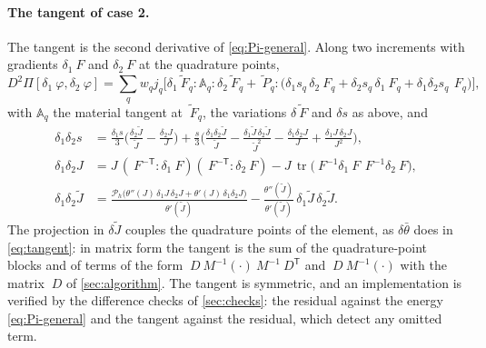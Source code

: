 \documentclass{article}
\newcommand{\F}{~F}
\renewcommand{\P}{~P}
\newcommand{\disp}{~\varphi}
\newcommand{\trace}{\operatorname{tr}}
\newcommand{\transpose}[1]{#1^{\mathsf{T}}}
\theoremstyle{definition}
\theoremstyle{plain}
\begin{document}
\paragraph{The tangent of case 2.} The tangent is the second derivative of
\eqref{eq:Pi-general}. Along two increments with gradients $\delta_1\F$ and
$\delta_2\F$ at the quadrature points,
\begin{equation}
  \label{eq:tangent-general}
  D^2\Pi[\delta_1\disp, \delta_2\disp]
  = \sum_q w_q j_q \Big[ \delta_1\tilde{\F}_q : \mathbb{A}_q : \delta_2\tilde{\F}_q
    + \tilde{\P}_q : \big( \delta_1 s_q\, \delta_2\F_q + \delta_2 s_q\, \delta_1\F_q
    + \delta_1\delta_2 s_q\, \F_q \big) \Big] ,
\end{equation}
with $\mathbb{A}_q$ the material tangent at $\tilde{\F}_q$, the variations
$\delta\tilde{\F}$ and $\delta s$ as above, and
\begin{equation}
  \label{eq:d2s}
  \begin{aligned}
  \delta_1\delta_2 s &= \frac{\delta_1 s}{3}\Big(\frac{\delta_2\tilde J}{\tilde J} - \frac{\delta_2 J}{J}\Big)
   + \frac{s}{3}\Big( \frac{\delta_1\delta_2\tilde J}{\tilde J} - \frac{\delta_1\tilde J\,\delta_2\tilde J}{\tilde J^2}
   - \frac{\delta_1\delta_2 J}{J} + \frac{\delta_1 J\,\delta_2 J}{J^2} \Big), \\
  \delta_1\delta_2 J &= J\,(\F^{-\mathsf T} : \delta_1\F)(\F^{-\mathsf T} : \delta_2\F)
   - J\,\trace\big(\F^{-1}\delta_1\F\,\F^{-1}\delta_2\F\big), \\
  \delta_1\delta_2\tilde J &= \frac{\mathcal{P}_h\big(\theta''(J)\,\delta_1 J\,\delta_2 J + \theta'(J)\,\delta_1\delta_2 J\big)}{\theta'(\tilde J)}
   - \frac{\theta''(\tilde J)}{\theta'(\tilde J)}\, \delta_1\tilde J\, \delta_2\tilde J .
  \end{aligned}
\end{equation}
The projection in $\delta\tilde J$ couples the quadrature points of the
element, as $\delta\bar\theta$ does in \eqref{eq:tangent}: in matrix form
the tangent is the sum of the quadrature-point blocks and of terms of the
form $~D ~M^{-1} (\cdot) ~M^{-1} \transpose{~D}$ and $~D ~M^{-1}(\cdot)$
with the matrix $~D$ of \cref{sec:algorithm}. The tangent is symmetric,
and an implementation is verified by the difference checks of
\cref{sec:checks}: the residual against the energy \eqref{eq:Pi-general}
and the tangent against the residual, which detect any omitted term.
\end{document}

